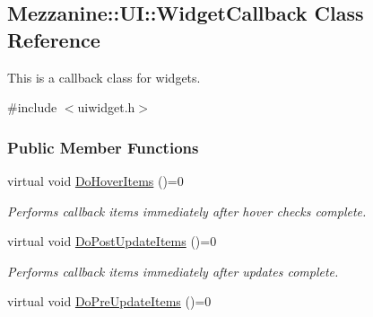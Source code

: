 \hypertarget{classMezzanine_1_1UI_1_1WidgetCallback}{
\subsection{Mezzanine::UI::WidgetCallback Class Reference}
\label{classMezzanine_1_1UI_1_1WidgetCallback}
}


This is a callback class for widgets.  




{\ttfamily \#include $<$uiwidget.h$>$}

\subsubsection*{Public Member Functions}
\begin{DoxyCompactItemize}
\item 
\hypertarget{classMezzanine_1_1UI_1_1WidgetCallback_ab0efad1230a035f7f03bbf385a48e783}{
virtual void \hyperlink{classMezzanine_1_1UI_1_1WidgetCallback_ab0efad1230a035f7f03bbf385a48e783}{DoHoverItems} ()=0}
\label{classMezzanine_1_1UI_1_1WidgetCallback_ab0efad1230a035f7f03bbf385a48e783}

\begin{DoxyCompactList}\small\item\em Performs callback items immediately after hover checks complete. \item\end{DoxyCompactList}\item 
\hypertarget{classMezzanine_1_1UI_1_1WidgetCallback_a62c3b86e1727b8ee98a2b1cc14e96c26}{
virtual void \hyperlink{classMezzanine_1_1UI_1_1WidgetCallback_a62c3b86e1727b8ee98a2b1cc14e96c26}{DoPostUpdateItems} ()=0}
\label{classMezzanine_1_1UI_1_1WidgetCallback_a62c3b86e1727b8ee98a2b1cc14e96c26}

\begin{DoxyCompactList}\small\item\em Performs callback items immediately after updates complete. \item\end{DoxyCompactList}\item 
\hypertarget{classMezzanine_1_1UI_1_1WidgetCallback_a2a5a9ed4a8bc31006d2d38d5c308999b}{
virtual void \hyperlink{classMezzanine_1_1UI_1_1WidgetCallback_a2a5a9ed4a8bc31006d2d38d5c308999b}{DoPreUpdateItems} ()=0}
\label{classMezzanine_1_1UI_1_1WidgetCallback_a2a5a9ed4a8bc31006d2d38d5c308999b}


\end{DoxyCompactItemize}
